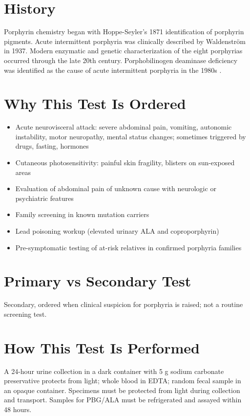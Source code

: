 \section*{History}
Porphyrin chemistry began with Hoppe-Seyler's 1871 identification of porphyrin pigments. Acute intermittent porphyria was clinically described by Waldenström in 1937. Modern enzymatic and genetic characterization of the eight porphyrias occurred through the late 20th century. Porphobilinogen deaminase deficiency was identified as the cause of acute intermittent porphyria in the 1980s \cite{puy2010porphyrias}.

\section*{Why This Test Is Ordered}
\begin{itemize}
  \item Acute neurovisceral attack: severe abdominal pain, vomiting, autonomic instability, motor neuropathy, mental status changes; sometimes triggered by drugs, fasting, hormones
  \item Cutaneous photosensitivity: painful skin fragility, blisters on sun-exposed areas
  \item Evaluation of abdominal pain of unknown cause with neurologic or psychiatric features
  \item Family screening in known mutation carriers
  \item Lead poisoning workup (elevated urinary ALA and coproporphyrin)
  \item Pre-symptomatic testing of at-risk relatives in confirmed porphyria families
\end{itemize}

\section*{Primary vs Secondary Test}
Secondary, ordered when clinical suspicion for porphyria is raised; not a routine screening test.

\section*{How This Test Is Performed}
A 24-hour urine collection in a dark container with 5 g sodium carbonate preservative protects from light; whole blood in EDTA; random fecal sample in an opaque container. Specimens must be protected from light during collection and transport. Samples for PBG/ALA must be refrigerated and assayed within 48 hours.

